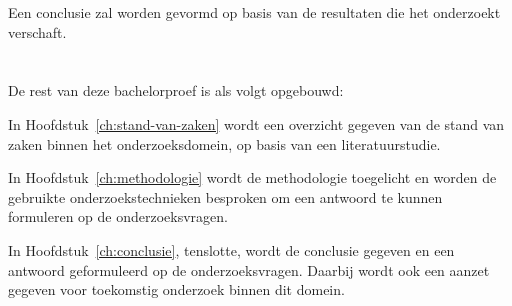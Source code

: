 Een conclusie zal worden gevormd op basis van de resultaten die het onderzoekt verschaft.

\section{}%
\label{sec:opzet-bachelorproef}


De rest van deze bachelorproef is als volgt opgebouwd:

In Hoofdstuk~\ref{ch:stand-van-zaken} wordt een overzicht gegeven van de stand van zaken binnen het onderzoeksdomein, op basis van een literatuurstudie.

In Hoofdstuk~\ref{ch:methodologie} wordt de methodologie toegelicht en worden de gebruikte onderzoekstechnieken besproken om een antwoord te kunnen formuleren op de onderzoeksvragen.


In Hoofdstuk~\ref{ch:conclusie}, tenslotte, wordt de conclusie gegeven en een antwoord geformuleerd op de onderzoeksvragen. Daarbij wordt ook een aanzet gegeven voor toekomstig onderzoek binnen dit domein.